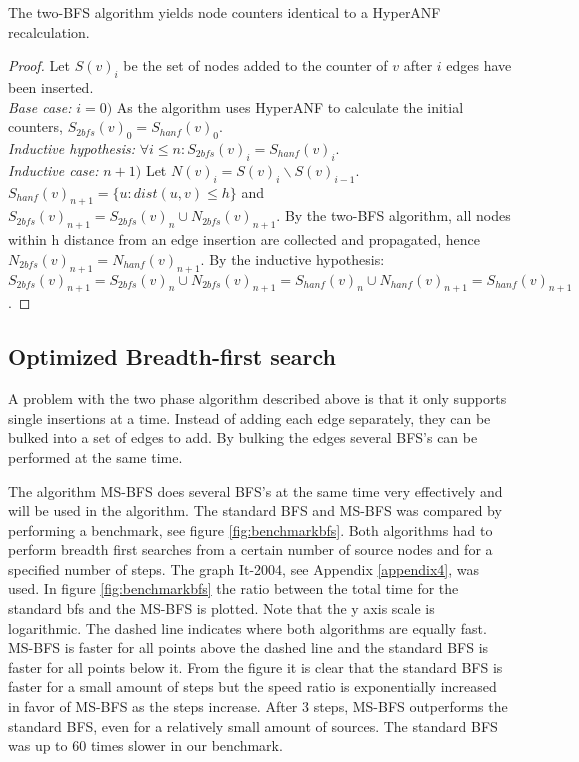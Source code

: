 \begin{theorem} The two-BFS algorithm yields node counters identical to a HyperANF recalculation.

\begin{proof}Let $S(v)_i$ be the set of nodes added to the counter of $v$ after $i$ edges have been inserted.\\

\noindent\textit{Base case:} $i = 0)$ As the algorithm uses HyperANF to calculate the initial counters, $S_{2bfs}(v)_0 = S_{hanf}(v)_0$.\\

\noindent\textit{Inductive hypothesis: } $\forall i \leq n : S_{2bfs}(v)_i = S_{hanf}(v)_i$.\\

\noindent\textit{Inductive case: } $n + 1)$ Let $N(v)_i = S(v)_i \backslash S(v)_{i-1}$.  $S_{hanf}(v)_{n+1} = \{ u : dist(u,v) \leq h \}$ and $S_{2bfs}(v)_{n+1} = S_{2bfs}(v)_{n} \cup N_{2bfs}(v)_{n+1}$. By the two-BFS algorithm, all nodes within h distance from an edge insertion are collected and propagated, hence $N_{2bfs}(v)_{n+1} = N_{hanf}(v)_{n+1}$. By the inductive hypothesis: $S_{2bfs}(v)_{n+1} = S_{2bfs}(v)_n \cup N_{2bfs}(v)_{n+1} = S_{hanf}(v)_n \cup N_{hanf}(v)_{n+1} = S_{hanf}(v)_{n+1}$.
\end{proof}
\end{theorem}

\subsection{Optimized Breadth-first search}

A problem with the two phase algorithm described above is that it only supports single insertions at a time. Instead of adding each edge separately, they can be bulked into a set of edges to add. By bulking the edges several BFS's can be performed at the same time. 

The algorithm MS-BFS \cite{msbfs} does several BFS's at the same time very effectively and will be used in the algorithm. The standard BFS and MS-BFS was compared by performing a benchmark, see figure \ref{fig:benchmarkbfs}. Both algorithms had to perform breadth first searches from a certain number of source nodes and for a specified number of steps. The graph It-2004, see Appendix \ref{appendix4}, was used. In figure \ref{fig:benchmarkbfs} the ratio between the total time for the standard bfs and the MS-BFS is plotted. Note that the y axis scale is logarithmic. The dashed line indicates where both algorithms are equally fast. MS-BFS is faster for all points above the dashed line and the standard BFS is faster for all points below it. From the figure it is clear that the standard BFS is faster for a small amount of steps but the speed ratio is exponentially increased in favor of MS-BFS as the steps increase. After $3$ steps, MS-BFS outperforms the standard BFS, even for a relatively small amount of sources. The standard BFS was up to $60$ times slower in our benchmark.

